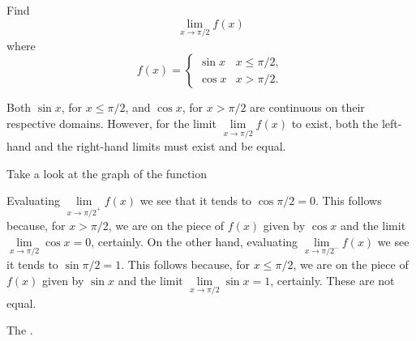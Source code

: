 \documentclass{ximera}
\begin{document}
\begin{question}
  Find 
  \[
  \displaystyle \lim_{x\to \pi/2} f(x)
  \]
  where
  \[
  f(x) = \left\{\begin{array}{cl} \sin x & x\leq \pi/2, \\ \cos x & x>\pi/2. \end{array}\right.
  \]
  \begin{solution}
    \begin{hint}
     Both $\sin x$, for $x\leq\pi/2$, and $\cos x$, for $x>\pi/2$ are continuous on their respective domains. However, for the limit $\lim\limits_{x\to\pi/2}f(x)$ to exist, both the left-hand and the right-hand limits must exist and be equal.
    \end{hint}
     \begin{hint}
    	Take a look at the graph of the function
    \begin{center}
      \end{center} 
    \end{hint}
    \begin{hint}
     Evaluating $\lim\limits_{x\to{\pi/2}^{+}}f(x)$ we see that it tends to $\cos \pi/2=0$. This follows because, for $x>\pi/2$, we are on the piece of $f(x)$ given by $\cos x$ and the limit $\lim\limits_{x\to{\pi/2}}\cos x=0$, certainly. On the other hand, evaluating $\lim\limits_{x\to{\pi/2}^{-}}f(x)$ we see it tends to $\sin \pi/2=1$. This follows because, for $x\leq\pi/2$, we are on the piece of $f(x)$ given by $\sin x$ and the limit $\lim\limits_{x\to\pi/2}\sin x=1$, certainly. These are not equal.
    \end{hint}
     The 
    .
  \end{solution}
\end{question}
\end{document}
